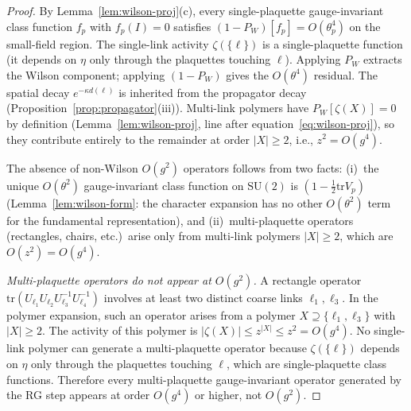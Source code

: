 \documentclass[11pt]{article}
\theoremstyle{definition}
\newcommand{\SU}{\mathrm{SU}}
\newcommand{\tr}{\mathrm{tr}}
\begin{document}
\begin{proof}
By Lemma~\ref{lem:wilson-proj}(c), every single-plaquette
gauge-invariant class function $f_p$ with $f_p(I)=0$ satisfies
$(1-P_W)[f_p]=O(\theta_p^4)$ on the small-field region.
The single-link activity $\zeta(\{\ell\})$ is a
single-plaquette function (it depends on $\eta$ only through
the plaquettes touching $\ell$).
Applying $P_W$ extracts the Wilson component; applying
$(1-P_W)$ gives the $O(\theta^4)$ residual.
The spatial decay $e^{-\kappa d(\ell)}$ is inherited from
the propagator decay
(Proposition~\ref{prop:propagator}(iii)).
Multi-link polymers have $P_W[\zeta(X)]=0$ by definition
(Lemma~\ref{lem:wilson-proj}, line after
equation~\eqref{eq:wilson-proj}), so they contribute
entirely to the remainder at order $|X|\ge 2$, i.e.,
$z^2=O(g^4)$.

The absence of non-Wilson $O(g^2)$ operators follows from
two facts: (i)~the unique $O(\theta^2)$ gauge-invariant
class function on $\SU(2)$ is $(1-\frac{1}{2}\tr V_p)$
(Lemma~\ref{lem:wilson-form}: the character expansion
has no other $O(\theta^2)$ term for the fundamental
representation), and (ii)~multi-plaquette operators
(rectangles, chairs, etc.)\ arise only from multi-link
polymers $|X|\ge 2$, which are $O(z^2)=O(g^4)$.

\emph{Multi-plaquette operators do not appear at $O(g^2)$.}
A rectangle operator $\tr(U_{\ell_1}U_{\ell_2}U_{\ell_3}^{-1}
U_{\ell_4}^{-1})$ involves at least two distinct coarse links
$\ell_1,\ell_3$.  In the polymer expansion, such an operator
arises from a polymer $X\supseteq\{\ell_1,\ell_3\}$ with
$|X|\ge 2$.  The activity of this polymer is
$|\zeta(X)|\le z^{|X|}\le z^2=O(g^4)$.
No single-link polymer can generate a multi-plaquette operator
because $\zeta(\{\ell\})$ depends on $\eta$ only through
the plaquettes touching $\ell$, which are single-plaquette
class functions.  Therefore every multi-plaquette
gauge-invariant operator generated by the RG step
appears at order $O(g^4)$ or higher, not $O(g^2)$.
\end{proof}
\end{document}
